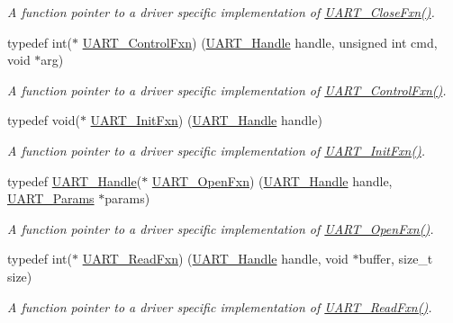 \begin{DoxyCompactItemize}
\begin{DoxyCompactList}\small\item\em A function pointer to a driver specific implementation of \hyperlink{_u_a_r_t_8h_ae08ff15291bd6b21cb4e2eb1fce164a6}{U\+A\+R\+T\+\_\+\+Close\+Fxn()}. \end{DoxyCompactList}\item 
typedef int($\ast$ \hyperlink{_u_a_r_t_8h_a4fc98447e6dd805e2d072917e8e6da3b}{U\+A\+R\+T\+\_\+\+Control\+Fxn}) (\hyperlink{_u_a_r_t_8h_a13cc669fae768d8212e6491ce71b28af}{U\+A\+R\+T\+\_\+\+Handle} handle, unsigned int cmd, void $\ast$arg)
\begin{DoxyCompactList}\small\item\em A function pointer to a driver specific implementation of \hyperlink{_u_a_r_t_8h_a4fc98447e6dd805e2d072917e8e6da3b}{U\+A\+R\+T\+\_\+\+Control\+Fxn()}. \end{DoxyCompactList}\item 
typedef void($\ast$ \hyperlink{_u_a_r_t_8h_a2b3e89df3065fffb47e7354067c14d1b}{U\+A\+R\+T\+\_\+\+Init\+Fxn}) (\hyperlink{_u_a_r_t_8h_a13cc669fae768d8212e6491ce71b28af}{U\+A\+R\+T\+\_\+\+Handle} handle)
\begin{DoxyCompactList}\small\item\em A function pointer to a driver specific implementation of \hyperlink{_u_a_r_t_8h_a2b3e89df3065fffb47e7354067c14d1b}{U\+A\+R\+T\+\_\+\+Init\+Fxn()}. \end{DoxyCompactList}\item 
typedef \hyperlink{_u_a_r_t_8h_a13cc669fae768d8212e6491ce71b28af}{U\+A\+R\+T\+\_\+\+Handle}($\ast$ \hyperlink{_u_a_r_t_8h_a39e21ac60f24eb9ce32286e21de713d1}{U\+A\+R\+T\+\_\+\+Open\+Fxn}) (\hyperlink{_u_a_r_t_8h_a13cc669fae768d8212e6491ce71b28af}{U\+A\+R\+T\+\_\+\+Handle} handle, \hyperlink{struct_u_a_r_t___params}{U\+A\+R\+T\+\_\+\+Params} $\ast$params)
\begin{DoxyCompactList}\small\item\em A function pointer to a driver specific implementation of \hyperlink{_u_a_r_t_8h_a39e21ac60f24eb9ce32286e21de713d1}{U\+A\+R\+T\+\_\+\+Open\+Fxn()}. \end{DoxyCompactList}\item 
typedef int($\ast$ \hyperlink{_u_a_r_t_8h_a4d855b637a26d787afec822d4cd2978e}{U\+A\+R\+T\+\_\+\+Read\+Fxn}) (\hyperlink{_u_a_r_t_8h_a13cc669fae768d8212e6491ce71b28af}{U\+A\+R\+T\+\_\+\+Handle} handle, void $\ast$buffer, size\+\_\+t size)
\begin{DoxyCompactList}\small\item\em A function pointer to a driver specific implementation of \hyperlink{_u_a_r_t_8h_a4d855b637a26d787afec822d4cd2978e}{U\+A\+R\+T\+\_\+\+Read\+Fxn()}. \end{DoxyCompactList}\item 

\end{DoxyCompactItemize}
